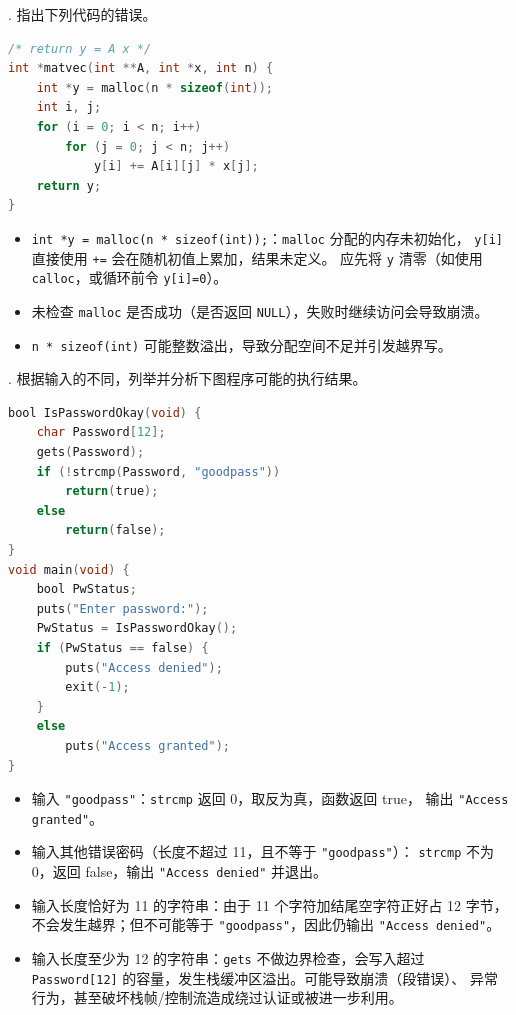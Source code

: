 \documentclass[UTF8]{ctexart}
\begin{document}
. 指出下列代码的错误。

\begin{lstlisting}[language=C]
/* return y = A x */
int *matvec(int **A, int *x, int n) {
    int *y = malloc(n * sizeof(int));
    int i, j;
    for (i = 0; i < n; i++)
        for (j = 0; j < n; j++)
            y[i] += A[i][j] * x[j];
    return y;
}
\end{lstlisting}

\begin{tcolorbox}[title=答题区, height=4.5cm]
\end{tcolorbox}

\begin{itemize}
  \item [(1)]\texttt{int *y = malloc(n * sizeof(int));}：\texttt{malloc} 分配的内存未初始化，
        \texttt{y[i]} 直接使用 \texttt{+=} 会在随机初值上累加，结果未定义。
        应先将 \texttt{y} 清零（如使用 \texttt{calloc}，或循环前令 \texttt{y[i]=0}）。
  \item [(2)]未检查 \texttt{malloc} 是否成功（是否返回 \texttt{NULL}），失败时继续访问会导致崩溃。
  \item [(3)]\texttt{n * sizeof(int)} 可能整数溢出，导致分配空间不足并引发越界写。
\end{itemize}



. 根据输入的不同，列举并分析下图程序可能的执行结果。

\begin{lstlisting}[language=C]
bool IsPasswordOkay(void) {
    char Password[12];
    gets(Password);
    if (!strcmp(Password, "goodpass"))
        return(true);
    else
        return(false);
}
void main(void) {
    bool PwStatus;
    puts("Enter password:");
    PwStatus = IsPasswordOkay();
    if (PwStatus == false) {
        puts("Access denied");
        exit(-1);
    }
    else
        puts("Access granted");
}
\end{lstlisting}

\begin{tcolorbox}[title=答题区, height=6cm]
\end{tcolorbox}

\begin{itemize}
  \item [(1)]输入 \texttt{"goodpass"}：\texttt{strcmp} 返回 0，取反为真，函数返回 true，
        输出 \texttt{"Access granted"}。
  \item [(2)]输入其他错误密码（长度不超过 11，且不等于 \texttt{"goodpass"}）：
        \texttt{strcmp} 不为 0，返回 false，输出 \texttt{"Access denied"} 并退出。
  \item [(3)]输入长度恰好为 11 的字符串：由于 11 个字符加结尾空字符正好占 12 字节，
        不会发生越界；但不可能等于 \texttt{"goodpass"}，因此仍输出 \texttt{"Access denied"}。
  \item [(4)]输入长度至少为 12 的字符串：\texttt{gets} 不做边界检查，会写入超过
        \texttt{Password[12]} 的容量，发生栈缓冲区溢出。可能导致崩溃（段错误）、
        异常行为，甚至破坏栈帧/控制流造成绕过认证或被进一步利用。
\end{itemize}
\end{document}
